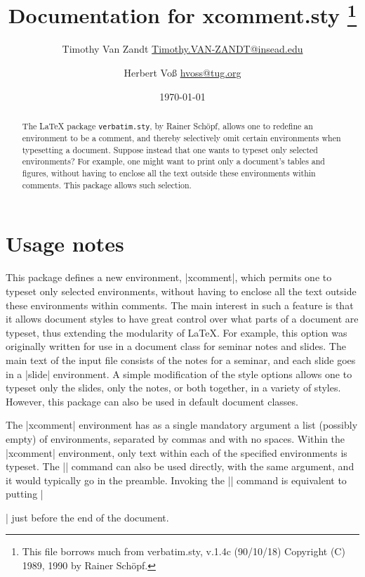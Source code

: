 \documentclass{article}
\title{Documentation for xcomment.sty%
   \thanks{This file borrows much from verbatim.sty, v.1.4c (90/10/18)
  Copyright (C) 1989, 1990 by Rainer Sch\"opf.}}
\author{Timothy Van Zandt \url{Timothy.VAN-ZANDT@insead.edu}\and Herbert Voß \url{hvoss@tug.org}}
\date{\today}
\begin{document}
\maketitle
\clearpage
\tableofcontents

\clearpage
{}

\begin{abstract}
The \LaTeX{} package \verb|verbatim.sty|, by Rainer Sch\"opf, allows one to
redefine an environment to be a comment, and thereby selectively omit
certain environments when typesetting a document.
Suppose instead that one wants to typeset only selected environments? For
example, one might want to print only a document's tables and figures,
without having to enclose all the text outside these environments within
comments. This package allows such selection.
\end{abstract}

\section{Usage notes}

This package defines a new environment, |xcomment|, which permits one to
typeset only selected environments, without having to enclose all the text
outside these environments within comments. The main interest in such a
feature is that it allows document styles to have great control over what
parts of a document are typeset, thus extending the modularity of \LaTeX.
For example, this option was originally written for use in a document class
for seminar notes and slides. The main text of the input file consists of
the notes for a seminar, and each slide goes in a |slide| environment. A
simple modification of the style options allows one to typeset only the
slides, only the notes, or both together, in a variety of styles.
However, this package can also be used in default document classes.


The |xcomment| environment has as a single mandatory argument a list
(possibly empty) of environments, separated by commas and with no spaces.
Within the |xcomment| environment, only text within each of the specified
environments is typeset.
The |\xcomment| command can also be used directly, with the same argument,
and it would typically go in the preamble. Invoking the |\xcomment| command
is equivalent to putting || just before the end of the document.
\end{document}
